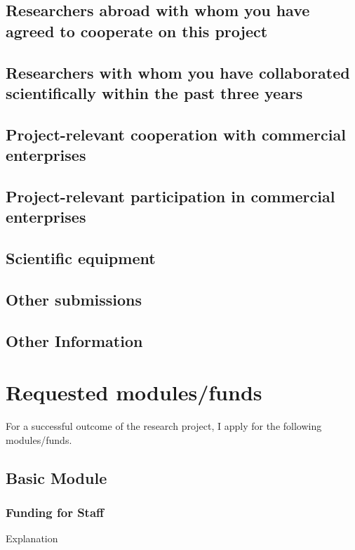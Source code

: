 \documentclass[12pt]{scrartcl}
\begin{document}
\subsection{Researchers abroad with whom you have agreed to cooperate on this project}

\subsection{Researchers with whom you have collaborated scientifically within the past three years}

\subsection{Project-relevant cooperation with commercial enterprises}

\subsection{Project-relevant participation in commercial enterprises}

\subsection{Scientific equipment}

\subsection{Other submissions}

\subsection{Other Information}


\newpage
\section{Requested modules/funds}
For a successful outcome of the research project, I apply for the following
modules/funds.
\subsection{Basic Module}
\subsubsection{Funding for Staff}
\begin{description}[labelindent=1cm]
    \item[Person (X\euro):] Explanation
\end{description}
\end{document}

